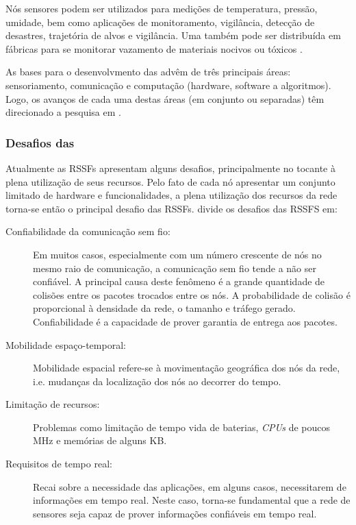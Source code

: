 Nós sensores podem ser utilizados para medições de temperatura, pressão, umidade, bem como aplicações de monitoramento, vigilância, detecção de desastres, trajetória de alvos e vigilância. Uma \rssf também pode ser distribuída em fábricas para se monitorar vazamento de materiais nocivos ou tóxicos \cite{Aboelaze2005}.


As bases para o desenvolvmento das \rssfs advêm de três principais áreas: sensoriamento, comunicação e computação (hardware, software a algoritmos). Logo, os avanços de cada uma destas áreas (em conjunto ou separadas) têm direcionado a pesquisa em \rssf\cite{Chong2003}. 

\subsubsection{Desafios das \rssfs}

Atualmente as RSSFs apresentam alguns desafios, principalmente no tocante à plena utilização de seus recursos. Pelo fato de cada nó apresentar um conjunto limitado de hardware e funcionalidades, a plena utilização dos recursos da rede torna-se então o principal desafio das RSSFs.
\cite{Dressler2007} divide os desafios das RSSFS em:

\begin{description}
\item [Confiabilidade da comunicação sem fio:] Em muitos casos, especialmente com um número crescente de nós no mesmo raio de comunicação, a comunicação sem fio  tende a não ser confiável. A principal causa deste fenômeno é a grande quantidade de colisões entre os pacotes trocados entre os nós. A probabilidade de colisão é proporcional à densidade da rede, o tamanho e tráfego gerado. Confiabilidade é a capacidade de prover garantia de entrega aos pacotes.
			
\item [Mobilidade espaço-temporal:] Mobilidade espacial refere-se à movimentação geográfica dos nós da rede, i.e. mudanças da localização dos nós ao decorrer do tempo.
			
\item [Limitação de recursos:] Problemas como limitação de tempo vida de baterias, \emph{CPUs} de poucos MHz e memórias de alguns KB.
			
\item [Requisitos de tempo real:] Recai sobre a necessidade das aplicações, em alguns casos, necessitarem de informações em tempo real. Neste caso, torna-se fundamental que a rede de sensores seja capaz de prover informações confiáveis em tempo real.	
\end{description}


